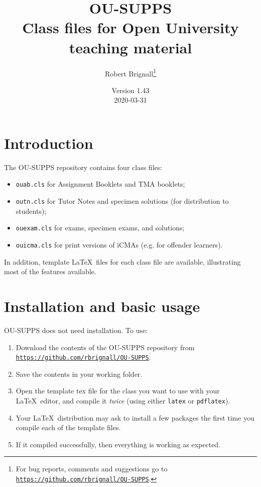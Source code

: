 \documentclass[a4paper]{ltxguide}
\title{\textsf{OU-SUPPS}\\Class files for Open University teaching material}
\author{Robert Brignall\footnote{For bug reports, comments and
suggestions go to \href{https://github.com/rbrignall/OU-SUPPS}%
{\texttt{https://github.com/rbrignall/OU-SUPPS}}.}}
\date{Version 1.43\\2020-03-31}
\newcommand\3{\unskip\enspace\fbox{\fontsize{4}{4}\selectfont NEW 3.0}}
\begin{document}
\maketitle

\tableofcontents

\section{Introduction}

The \textsf{OU-SUPPS} repository contains four class files:
\begin{itemize}
\item \texttt{ouab.cls} for Assignment Booklets and TMA booklets;
\item \texttt{outn.cls} for Tutor Notes and specimen solutions (for distribution to students);
\item \texttt{ouexam.cls} for exams, specimen exams, and solutions;
\item \texttt{ouicma.cls} for print versions of iCMAs (e.g. for offender learners).
\end{itemize}

In addition, template \LaTeX\ files for each class file are available, illustrating most of the features available.

\section{Installation and basic usage}

\textsf{OU-SUPPS} does not need installation. To use:

\begin{enumerate}
\item Download the contents of the \textsf{OU-SUPPS} repository from \href{https://github.com/rbrignall/OU-SUPPS}%
{\texttt{https://github.com/rbrignall/OU-SUPPS}}.
\item Save the contents in your working folder.
\item Open the template tex file for the class you want to use with your \LaTeX\ editor, and compile it \emph{twice} (using either \texttt{latex} or \texttt{pdflatex}). 
\item Your \LaTeX\ distribution may ask to install a few packages the first time you compile each of the template files.
\item If it compiled successfully, then everything is working as expected.
\end{enumerate}
\end{document}
